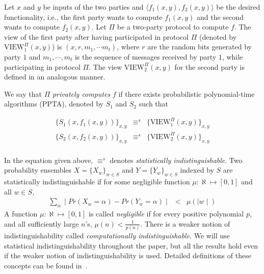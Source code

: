 \begin{definition}
\label{def:privacy}
\rm
Let $x$ and $y$ be inputs of the two parties and $\langle f_1 (x,y),
f_2 (x,y) \rangle$ be the desired functionality, i.e., the first party
wants to compute $f_1 (x,y)$ and the second wants to compute $f_2
(x,y)$. Let $\Pi$ be a two-party protocol to compute $f$. The view
of the first party after having participated in protocol $\Pi$ 
(denoted by $\mbox{VIEW}_1^\Pi (x,y)$) is $(x,r,m_1, \cdots m_t)$, where
$r$ are the random bits generated by party $1$ and $m_1, \cdots, m_t$ is the
sequence of messages received by party $1$, while participating in protocol
$\Pi$. The view $\mbox{VIEW}_2^\Pi (x,y)$ for the second party  is defined
in an analogous manner.

We say that $\Pi$ {\em privately computes} $f$ if there exists 
probabilistic polynomial-time algorithms (PPTA), denoted by $S_1$ and $S_2$
such that

\begin{eqnarray*}
\{ S_1 (x,f_1 (x,y)) \}_{x,y} & \equiv^s & \{ \mbox{VIEW}_1^\Pi (x,y) \}_{x,y} \\
\{ S_2 (x,f_2 (x,y)) \}_{x,y} & \equiv^s & \{ \mbox{VIEW}_2^\Pi (x,y) \}_{x,y} \\
\end{eqnarray*}

In the equation given above, $\equiv^s$ denotes {\em statistically
indistinguishable}.  Two probability ensembles $X = \{ X_w \}_{w \in
S}$ and $Y = \{ Y_w \}_{w \in S}$ indexed by $S$ are statistically
indistinguishable if for some negligible function $\mu : \aleph \mapsto
[0,1]$ and all $w \in S$,
\begin{eqnarray*}
\sum_{\alpha} \mid Pr ( X_w = \alpha ) - Pr ( Y_w = \alpha ) \mid & < & \mu ( \mid w \mid )
\end{eqnarray*}
A function $\mu : \aleph \mapsto [0,1]$ is called {\it negligible}
if for every positive polynomial $p$, and all sufficiently large $n$'s,
$\mu (n) < \frac{1}{p(n)}$. There is a weaker notion of indistinguishability
called {\em computationally indistinguishable}. We will use statistical
indistinguishability throughout the paper, but all the results hold even if
the weaker notion of indistinguishability is used. Detailed definitions of
these concepts can be found in~\cite{GoldreichBookVol1,Goldreich:vol2}. 

\end{definition}

